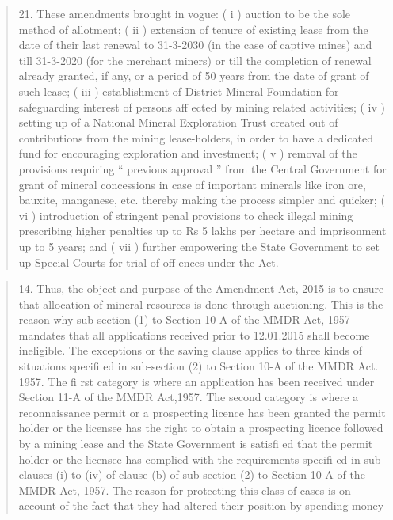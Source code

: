 \documentclass[12pt,a4paper]{article}
\newenvironment{judgequote}
  {\begin{quote}\small}
  {\end{quote}}
\begin{document}
\begin{judgequote}
21. These amendments brought in vogue: ( i ) auction to be the sole
method of allotment; ( ii ) extension of tenure of existing lease from the
date of their last renewal to 31-3-2030 (in the case of captive mines)
and till 31-3-2020 (for the merchant miners) or till the completion
of renewal already granted, if any, or a period of 50 years from the
date of grant of such lease; ( iii ) establishment of District Mineral
Foundation for safeguarding interest of persons aff ected by mining
related activities; ( iv ) setting up of a National Mineral Exploration Trust
created out of contributions from the mining lease-holders, in order
to have a dedicated fund for encouraging exploration and investment;
( v ) removal of the provisions requiring `` previous approval '' from
the Central Government for grant of mineral concessions in case of
important minerals like iron ore, bauxite, manganese, etc. thereby
making the process simpler and quicker; ( vi ) introduction of stringent
penal provisions to check illegal mining prescribing higher penalties
up to Rs 5 lakhs per hectare and imprisonment up to 5 years; and ( vii )
further empowering the State Government to set up Special Courts
for trial of off ences under the Act.
\end{judgequote}

\begin{judgequote}
14. Thus, the object and purpose of the Amendment Act, 2015 is to
ensure that allocation of mineral resources is done through auctioning. This
is the reason why sub-section (1) to Section 10-A of the MMDR Act, 1957
mandates that all applications received prior to 12.01.2015 shall become
ineligible. The exceptions or the saving clause applies to three kinds of
situations specifi ed in sub-section (2) to Section 10-A of the MMDR Act.
1957. The fi rst category is where an application has been received under
Section 11-A of the MMDR Act,1957. The second category is where
a reconnaissance permit or a prospecting licence has been granted the
permit holder or the licensee has the right to obtain a prospecting licence
followed by a mining lease and the State Government is satisfi ed that the
permit holder or the licensee has complied with the requirements specifi ed
in sub-clauses (i) to (iv) of clause (b) of sub-section (2) to Section 10-A of
the MMDR Act, 1957. The reason for protecting this class of cases is on
account of the fact that they had altered their position by spending money
\end{judgequote}
\end{document}

